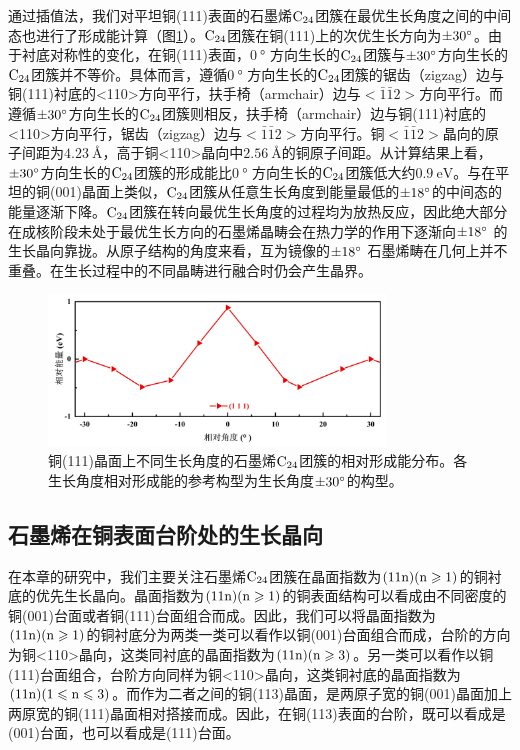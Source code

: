 通过插值法，我们对平坦铜(111)表面的石墨烯$\rm{C_{24}}$团簇在最优生长角度之间的中间态也进行了形成能计算（图\ref{fig:GO_111_energy}）。$\rm{C_{24}}$团簇在铜(111)上的次优生长方向为$\SI{\pm 30}{\degree}$。由于衬底对称性的变化，在铜(111)表面，$\SI{0}{\degree}$ 方向生长的$\rm{C_{24}}$团簇与$\SI{\pm 30}{\degree}$方向生长的$\rm{C_{24}}$团簇并不等价。具体而言，遵循$\SI{0}{\degree}$ 方向生长的$\rm{C_{24}}$团簇的锯齿（zigzag）边与铜(111)衬底的<110>方向平行，扶手椅（armchair）边与$<\bar{1}\bar{1}2>$方向平行。而遵循$\SI{\pm 30}{\degree}$方向生长的$\rm{C_{24}}$团簇则相反，扶手椅（armchair）边与铜(111)衬底的<110>方向平行，锯齿（zigzag）边与$<\bar{1}\bar{1}2>$方向平行。铜$<\bar{1}\bar{1}2>$晶向的原子间距为$\SI{4.23}{\angstrom}$，高于铜<110>晶向中$\SI{2.56}{\angstrom}$的铜原子间距。从计算结果上看，$\SI{\pm 30}{\degree}$方向生长的$\rm{C_{24}}$团簇的形成能比$\SI{0}{\degree}$ 方向生长的$\rm{C_{24}}$团簇低大约$\SI{0.9}{\electronvolt}$。与在平坦的铜(001)晶面上类似，$\rm{C_{24}}$团簇从任意生长角度到能量最低的$\SI{\pm 18 }{\degree}$的中间态的能量逐渐下降。$\rm{C_{24}}$团簇在转向最优生长角度的过程均为放热反应，因此绝大部分在成核阶段未处于最优生长方向的石墨烯晶畴会在热力学的作用下逐渐向$\SI{\pm 18}{\degree}$ 的生长晶向靠拢。从原子结构的角度来看，互为镜像的$\SI{\pm 18}{\degree}$ 石墨烯畴在几何上并不重叠。在生长过程中的不同晶畴进行融合时仍会产生晶界。

\begin{figure}[htb]
    \includegraphics[width=0.8\textwidth]{pic/GO_C24_flat_111_energy.png}
    \caption{铜(111)晶面上不同生长角度的石墨烯$\rm{C_{24}}$团簇的相对形成能分布。各生长角度相对形成能的参考构型为生长角度$\SI{\pm 30}{\degree}$的构型。
    }
    \label{fig:GO_111_energy}
\end{figure}

\subsection{石墨烯在铜表面台阶处的生长晶向}
在本章的研究中，我们主要关注石墨烯$\rm{C_{24}}$团簇在晶面指数为$\rm{(11n)(n \geqslant 1)}$的铜衬底的优先生长晶向。晶面指数为$\rm{(11n)(n \geqslant 1)}$的铜表面结构可以看成由不同密度的铜(001)台面或者铜(111)台面组合而成。因此，我们可以将晶面指数为$\rm{(11n)(n \geqslant 1)}$的铜衬底分为两类\chinesecolon 一类可以看作以铜(001)台面组合而成，台阶的方向为铜<110>晶向，这类同衬底的晶面指数为$\rm{(11n)(n \geqslant 3)}$。另一类可以看作以铜(111)台面组合，台阶方向同样为铜<110>晶向，这类铜衬底的晶面指数为$\rm{(11n)(1 \leqslant n \leqslant 3)}$。而作为二者之间的铜(113)晶面，是两原子宽的铜(001)晶面加上两原宽的铜(111)晶面相对搭接而成。因此，在铜(113)表面的台阶，既可以看成是(001)台面，也可以看成是(111)台面。

